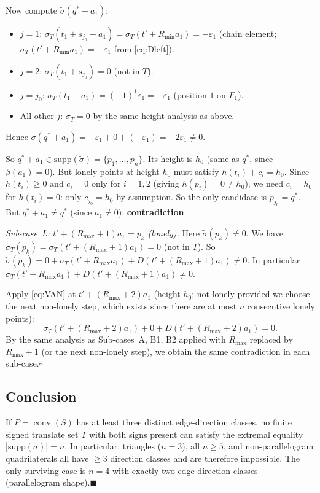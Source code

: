 Now compute $\tilde\sigma(q^*+a_1)$:
\begin{itemize}
\item $j=1$: $\sigma_T(t_1+s_{j_0}+a_1)=\sigma_T(t'+R_{\min}a_1)=-\varepsilon_1$
  (chain element; $\sigma_T(t'+R_{\min}a_1)=-\varepsilon_1$ from \eqref{eq:Dleft}).
\item $j=2$: $\sigma_T(t_1+s_{j_0})=0$ (not in $T$).
\item $j=j_0$: $\sigma_T(t_1+a_1)=(-1)^1\varepsilon_1=-\varepsilon_1$ (position $1$ on $F_1$).
\item All other $j$: $\sigma_T=0$ by the same height analysis as above.
\end{itemize}
Hence $\tilde\sigma(q^*+a_1)=-\varepsilon_1+0+(-\varepsilon_1)=-2\varepsilon_1\ne0$.

So $q^*+a_1\in\mathrm{supp}(\tilde\sigma)=\{p_1,\ldots,p_n\}$.
Its height is $h_0$ (same as $q^*$, since $\beta(a_1)=0$).
But lonely points at height $h_0$ must satisfy $h(t_i)+c_i=h_0$.
Since $h(t_i)\ge0$ and $c_i=0$ only for $i=1,2$ (giving $h(p_i)=0\ne h_0$),
we need $c_i=h_0$ for $h(t_i)=0$: only $c_{j_0}=h_0$ by assumption.
So the only candidate is $p_{j_0}=q^*$.
But $q^*+a_1\ne q^*$ (since $a_1\ne0$): \textbf{contradiction}.

\medskip\noindent\textit{Sub-case~L: $t'+(R_{\max}+1)a_1=p_k$ (lonely).}
Here $\tilde\sigma(p_k)\ne0$.  We have $\sigma_T(p_k)=\sigma_T(t'+(R_{\max}+1)a_1)=0$
(not in $T$).
So $\tilde\sigma(p_k)=0+\sigma_T(t'+R_{\max}a_1)+D(t'+(R_{\max}+1)a_1)\ne0$.
In particular $\sigma_T(t'+R_{\max}a_1)+D(t'+(R_{\max}+1)a_1)\ne0$.

Apply \eqref{eq:VAN} at $t'+(R_{\max}+2)a_1$ (height $h_0$; not lonely
provided we choose the next non-lonely step, which exists since there are
at most $n$ consecutive lonely points):
\[
  \sigma_T(t'+(R_{\max}+2)a_1)+0+D(t'+(R_{\max}+2)a_1)=0.
\]
By the same analysis as Sub-cases~A, B1, B2 applied with $R_{\max}$ replaced by
$R_{\max}+1$ (or the next non-lonely step), we obtain the same contradiction
in each sub-case.\hfill$\square$

\subsection*{Conclusion}

If $P=\operatorname{conv}(S)$ has at least three distinct edge-direction classes, no
finite signed translate set $T$ with both signs present can satisfy the extremal equality
$|\mathrm{supp}(\tilde\sigma)|=n$.
In particular: triangles ($n=3$), all $n\ge5$, and non-parallelogram quadrilaterals
all have $\ge3$ direction classes and are therefore impossible.
The only surviving case is $n=4$ with exactly two edge-direction classes
(parallelogram shape).\hfill$\blacksquare$
